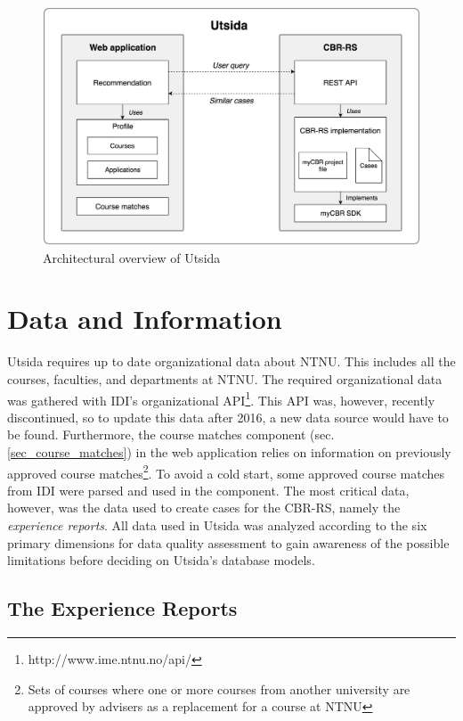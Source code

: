 \begin{figure}[H]
    \centering
    \includegraphics[width=1\textwidth]{fig/system_overview.png}
    \caption{Architectural overview of Utsida}
    \label{fig:system_overview}
\end{figure}

\section{Data and Information}

Utsida requires up to date organizational data about NTNU. This includes all the courses, faculties, and departments at NTNU. The required organizational data was gathered with IDI's organizational API\footnote{http://www.ime.ntnu.no/api/}. This API was, however, recently discontinued, so to update this data after 2016, a new data source would have to be found. Furthermore, the course matches component (sec. \ref{sec_course_matches}) in the web application relies on information on previously approved course matches\footnote{Sets of courses where one or more courses from another university are approved by advisers as a replacement for a course at NTNU}. To avoid a cold start, some approved course matches from IDI were parsed and used in the component. The most critical data, however, was the data used to create cases for the CBR-RS, namely the \textit{experience reports}. All data used in Utsida was analyzed according to the six primary dimensions for data quality assessment \cite{askham2013six} to gain awareness of the possible limitations before deciding on Utsida's database models.

\subsection{The Experience Reports}\label{sec:experience_reports}

